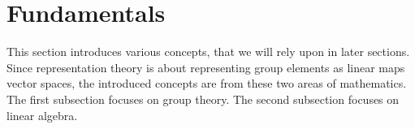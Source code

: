 \section{Fundamentals}

This section introduces various concepts, that we will rely upon in later sections.
Since representation theory is about representing group elements as linear maps vector spaces, the introduced concepts are from these two areas of mathematics.
The first subsection focuses on group theory.
The second subsection focuses on linear algebra.



